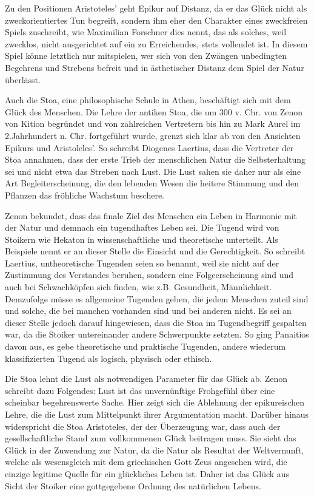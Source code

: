 Zu den Positionen Aristoteles' geht Epikur auf Distanz, da er das Glück nicht als zweckorientiertes Tun begreift, sondern ihm eher den Charakter eines \glqq zweckfreien Spiels\grqq{} zuschreibt, wie Maximilian Forschner dies nennt, \glqq das als solches, weil zwecklos, nicht ausgerichtet auf ein zu Erreichendes, stets vollendet ist.\grqq{} \cite[S.\,44]{MF93}
In diesem \glqq Spiel\grqq{} könne letztlich nur mitspielen, wer sich von den \glqq Zwängen unbedingten Begehrens und Strebens befreit und in ästhetischer Distanz dem Spiel der Natur überlässt.\grqq{} \cite[S.\,44]{MF93}
 
Auch die Stoa, eine philosophische Schule in Athen, beschäftigt sich mit dem Glück des Menschen. 
Die Lehre der antiken Stoa, die um 300 v. Chr. von Zenon von Kition begründet und von zahlreichen Vertretern bis hin zu Mark Aurel im 2.Jahrhundert n. Chr. fortgeführt wurde, grenzt sich klar ab von den Ansichten Epikurs und Aristoleles'. 
So schreibt Diogenes Laertius, dass die Vertreter der Stoa annahmen, dass der erste Trieb der menschlichen Natur die Selbsterhaltung sei und nicht etwa das Streben nach Lust\cite[S.\,48]{ZD67}.
Die Lust sahen sie daher nur als eine Art Begleiterscheinung, die \glqq den lebenden Wesen die heitere Stimmung und den Pflanzen das fröhliche Wachstum\grqq{} beschere. 

Zenon bekundet, dass das finale Ziel des Menschen ein Leben in Harmonie mit der Natur und demnach ein tugendhaftes Leben sei. 
Die Tugend wird von Stoikern wie Hekaton in wissenschaftliche und theoretische unterteilt. 
Als Beispiele nennt er an dieser Stelle die Einsicht und die Gerechtigkeit. 
So schreibt Laertius, untheoretische Tugenden seien so benannt, \glqq weil sie  nicht auf der Zustimmung des Verstandes beruhen, sondern eine Folgeerscheinung sind und auch bei Schwachköpfen sich finden, wie z.B. Gesundheit, Männlichkeit.\grqq{} \cite[S.\,50]{ZD67}
Demzufolge müsse es allgemeine Tugenden geben, die jedem Menschen zuteil sind und solche, die bei manchen vorhanden sind und bei anderen nicht. 
Es sei an dieser Stelle jedoch darauf hingewiesen, dass die Stoa im Tugendbegriff gespalten war, da die Stoiker untereinander andere Schwerpunkte setzten. 
So ging Panaitios davon aus, es gebe theoretische und praktische Tugenden, andere wiederum klassifizierten Tugend als logisch, physisch oder ethisch.

Die Stoa lehnt die Lust als notwendigen Parameter für das Glück ab. 
Zenon schreibt dazu Folgendes: \glqq Lust ist das unvernünftige Frohgefühl über eine scheinbar begehrenswerte Sache.\grqq{} \cite[S.\,60]{ZD67}
Hier zeigt sich die Ablehnung der epikureischen Lehre, die die Lust zum Mittelpunkt ihrer Argumentation macht. 
Darüber hinaus widerspricht die Stoa Aristoteles, der der Überzeugung war, dass auch der gesellschaftliche Stand zum vollkommenen Glück beitragen muss. 
Sie sieht das Glück in der Zuwendung zur Natur, da die Natur als Resultat der Weltvernunft, welche als wesensgleich mit dem griechischen Gott Zeus angesehen wird, die einzige legitime Quelle für ein glückliches Leben ist\cite[S.\,49]{ZD67}.
Daher ist das Glück aus Sicht der Stoiker eine gottgegebene Ordnung des natürlichen Lebens. 


